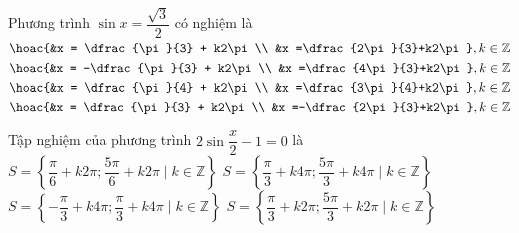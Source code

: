 \begin{ex}%
	Phương trình $\sin x = \dfrac{\sqrt{3}}{2}$ có nghiệm là 
	\choice 
		{\True $\hoac{&x  = \dfrac{\pi}{3} + k2\pi \\ &x =\dfrac{2\pi}{3}+k2\pi}, k \in \mathbb{Z}$}
		{$\hoac{&x =  -\dfrac{\pi}{3} + k2\pi \\ &x =\dfrac{4\pi}{3}+k2\pi}, k \in \mathbb{Z}$}
		{$\hoac{&x  = \dfrac{\pi}{4} + k2\pi \\ &x =\dfrac{3\pi}{4}+k2\pi}, k \in \mathbb{Z}$}
		{$\hoac{&x = \dfrac{\pi}{3} + k2\pi \\ &x =-\dfrac{2\pi}{3}+k2\pi}, k \in \mathbb{Z}$} 
\end{ex}

\begin{ex}%
	Tập nghiệm của phương trình $2\sin\dfrac{x}{2}-1=0$  là
	 \choice
		{$S=\left\lbrace\dfrac{\pi}{6}+k2\pi;\dfrac{5\pi}{6}+k2\pi\mid k\in\mathbb{Z}\right\rbrace$} 
		{\True  $S=\left\lbrace\dfrac{\pi}{3}+k4\pi;\dfrac{5\pi}{3}+k4\pi\mid k\in\mathbb{Z}\right\rbrace$}
		 {$S=\left\lbrace-\dfrac{\pi}{3}+k4\pi;\dfrac{\pi}{3}+k4\pi\mid k\in\mathbb{Z}\right\rbrace$}
		{$S=\left\lbrace\dfrac{\pi}{3}+k2\pi;\dfrac{5\pi}{3}+k2\pi\mid k\in\mathbb{Z}\right\rbrace$} 
\end{ex}

